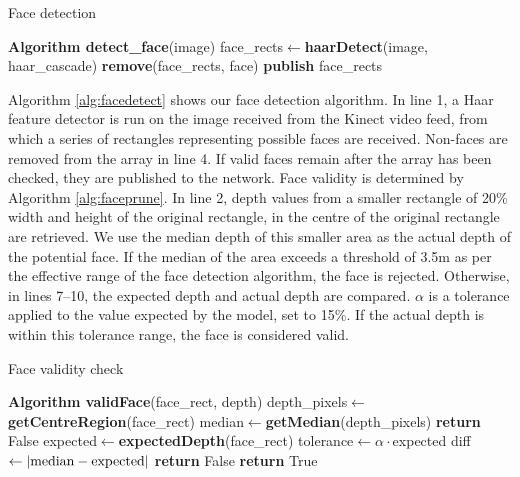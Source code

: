 \documentclass[conference]{IEEEtran}
\begin{document}
\begin{algorithm}
  \caption{Face detection}
  \label{alg:facedetect}
  \begin{algorithmic}[1]
    \State \textbf{Algorithm detect\_face}\textnormal{(image)}
    \State face\_rects$\leftarrow$\textbf{haarDetect}(image, haar\_cascade)
    \State \textbf{remove}(face\_rects, face)
    \EndIf
    \EndFor
    \State \textbf{publish} face\_rects
  \end{algorithmic}
\end{algorithm}
Algorithm \ref{alg:facedetect} shows our face detection algorithm. In line 1, a Haar feature detector is run on the image received from the Kinect video feed, from which a series of rectangles representing possible faces are received. Non-faces are removed from the array in line 4. If valid faces remain after the array has been checked, they are published to the network. Face validity is determined by Algorithm \ref{alg:faceprune}. In line 2, depth values from a smaller rectangle of 20\% width and height of the original rectangle, in the centre of the original rectangle are retrieved. We use the median depth of this smaller area as the actual depth of the potential face. If the median of the area exceeds a threshold of 3.5m as per the effective range of the face detection algorithm, the face is rejected. Otherwise, in lines 7--10, the expected depth and actual depth are compared. $\alpha$ is a tolerance applied to the value expected by the model, set to 15\%. If the actual depth is within this tolerance range, the face is considered valid.

\begin{algorithm}
  \caption{Face validity check}
  \label{alg:faceprune}
  \begin{algorithmic}[1]
    \State \textbf{Algorithm validFace}\textnormal{(face\_rect, depth)}
    \State depth\_pixels$\leftarrow$\textbf{getCentreRegion}(face\_rect)
    \State median$\leftarrow$\textbf{getMedian}(depth\_pixels)
    \State \textbf{return} False
    \Else
    \State expected$\leftarrow$\textbf{expectedDepth}(face\_rect)
    \State tolerance$\leftarrow \alpha \cdot$expected
    \State diff$\leftarrow \left|\textnormal{median}-\textnormal{expected}\right|$
    \State \textbf{return} False
    \EndIf
    \EndIf
    \State \textbf{return} True
  \end{algorithmic}
\end{algorithm}
\end{document}
